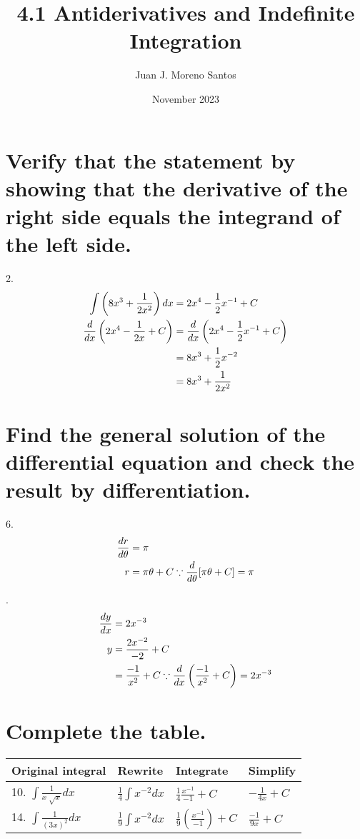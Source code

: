 \documentclass[11pt]{article}
\newcommand*{\vs}{\vspace{1cm}}
\newcommand*{\next}{\noindent}
\newcommand*{\set}{\setcounter{equation}{0}}
\begin{document}
\title{4.1 Antiderivatives and Indefinite Integration}
\author{Juan J. Moreno Santos}
\date{November 2023}

\maketitle

\section{Verify that the statement by showing that the derivative of the right side equals the integrand of the left side.}
2.\begin{align}
    \set
    \int \left(8x^3+\frac{1}{2x^2}\right)dx&=2x^4-\frac{1}{2}x^{-1}+C\\
    \frac{d}{dx}\left(2x^4-\frac{1}{2x}+C\right)&=\frac{d}{dx}\left(2x^4-\frac{1}{2}x^{-1}+C\right)\\
    &=8x^3+\frac{1}{2}x^{-2}\\
    &=8x^3+\frac{1}{2x^2}
\end{align}

\section{Find the general solution of the differential equation and check the result by differentiation.}
6.\begin{align}
    \set
    \frac{dr}{d\theta}&=\pi\\
    r&=\pi\theta+C\because\frac{d}{d\theta}[\pi\theta+C]=\pi\\
\end{align}

\vs\next
8.\begin{align}
    \set
    \frac{dy}{dx}&=2x^{-3}\\
    y&=\frac{2x^{-2}}{-2}+C\\
    &=\frac{-1}{x^2}+C\because \frac{d}{dx}\left(\frac{-1}{x^2}+C\right)=2x^{-3}
\end{align}

\section{Complete the table.}
\begin{flushleft}
    \begin{table}[h]
        \begin{tabular}{|l|l|l|l|}
        \hline
        Original integral & Rewrite & Integrate & Simplify\\\hline
        10. $\int\frac{1}{x\sqrt[]{x}}dx$ & $\frac{1}{4}\int x^{-2}dx$ & $\frac{1}{4}\frac{x^{-1}}{-1}+C$ & $-\frac{1}{4x}+C$\\\hline
        14. $\int \frac{1}{(3x)^2}dx$ & $\frac{1}{9}\int x^{-2}dx$ & $\frac{1}{9}\left(\frac{x^{-1}}{-1}\right)+C$ & $\frac{-1}{9x}+C$\\\hline
        \end{tabular}
    \end{table}
\end{flushleft}
\end{document}
